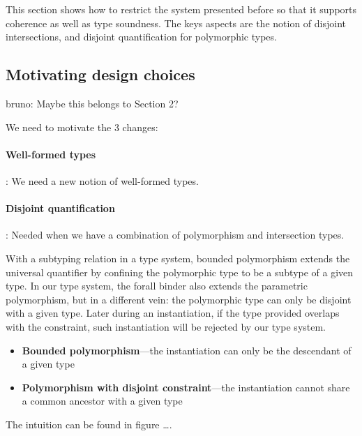 \documentclass[nocopyrightspace,preprint,times,9pt]{sigplanconf}
\newcommand{\authornote}[3]{{\color{#2} {\sc #1}: #3}}
\newcommand\bruno[1]{\authornote{bruno}{red}{#1}}
\begin{document}
This section shows how to restrict the system presented before
so that it supports coherence as well as type soundness.
The keys aspects are the notion of disjoint intersections,
and disjoint quantification for polymorphic types.

\subsection{Motivating design choices}\bruno{Maybe this belongs to Section 2?}

We need to motivate the 3 changes:

\paragraph{Well-formed types}: We need a new notion of well-formed types.

\paragraph{Disjoint quantification}: Needed when we have a
combination of polymorphism and intersection types.

With a subtyping relation in a type system, bounded polymorphism extends the universal quantifier by confining the polymorphic type to be a subtype of a given type. In our type system, the forall binder also extends the parametric polymorphism, but in a different vein: the polymorphic type can only be disjoint with a given type. Later during an instantiation, if the type provided overlaps with the constraint, such instantiation will be rejected by our type system.

\begin{itemize}
  \item \textbf{Bounded polymorphism}---the instantiation can only be the descendant of a given type
  \item \textbf{Polymorphism with disjoint constraint}---the instantiation cannot share a common ancestor with a given type
\end{itemize}

The intuition can be found in figure \ldots.
\end{document}
